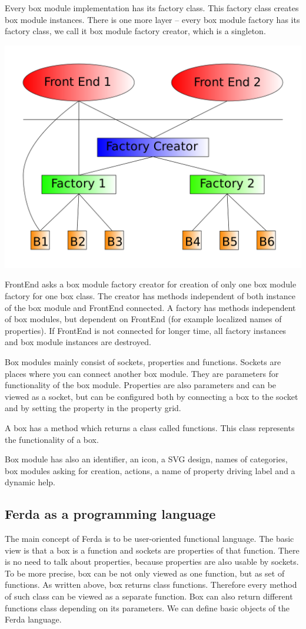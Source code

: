 \documentclass[a4paper,12pt]{book}
\begin{document}
Every box module implementation has its factory class. This factory class creates box module instances. There is one more layer -- every box module factory has its factory class, we call it box module factory creator, which is a singleton.

\noindent\includegraphics[width=13.72cm]{creatorFactory}

FrontEnd asks a box module factory creator for creation of only one box module factory for one box class. The creator has methods independent of both instance of the box module and FrontEnd connected. A factory has methods independent of box modules, but dependent on FrontEnd (for example localized names of properties). If FrontEnd is not connected for longer time, all factory instances and box module instances are destroyed.

Box modules mainly consist of sockets, properties and functions. Sockets are places where you can connect another box module. They are parameters for functionality of the box module. Properties are also parameters and can be viewed as a socket, but can be configured both by connecting a box to the socket and by setting the property in the property grid.

A box has a method which returns a class called functions. This class represents the functionality of a box.

Box module has also an identifier, an icon, a SVG design, names of categories, box modules asking for creation, actions, a name of property driving label and a dynamic help.

\subsection{Ferda as a programming language}
The main concept of Ferda is to be user-oriented functional language. The basic view is that a box is a function and sockets are properties of that function. There is no need to talk about properties, because properties are also usable by sockets. To be more precise, box can be not only viewed as one function, but as set of functions. As written above, box returns class functions. Therefore every method of such class can be viewed as a separate function. Box can also return different functions class depending on its parameters. We can define basic objects of the Ferda language.
\end{document}
